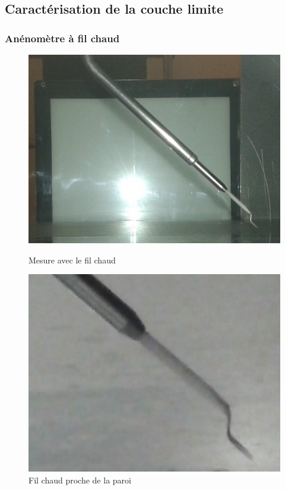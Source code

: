 \documentclass{beamer}
\begin{document}
\subsection{Caractérisation de la couche limite}\label{sec:caractérisation}
\begin{frame}
\frametitle{Anénomètre à fil chaud}
\begin{figure}[!ht]
	\centering
	\begin{minipage}{0.4\linewidth}
		\includegraphics[width = \linewidth]{./image/filchaud.jpg}
		\caption{Mesure avec le fil chaud}
	\end{minipage}
	\hfill
	\begin{minipage}{0.4\linewidth}
		\includegraphics[width=\linewidth]
		{./image/filchaud2.jpg}
		\caption{Fil chaud proche de la paroi}
	\end{minipage}
\end{figure}
\end{frame}
\end{document}
